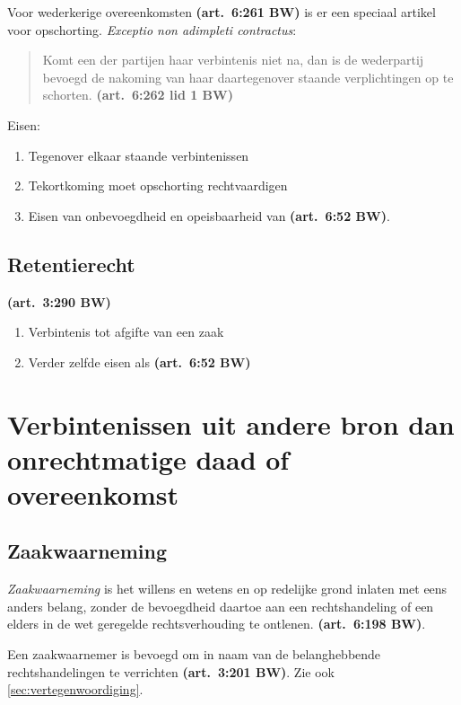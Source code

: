 \documentclass[a4paper]{article}
\newcommand{\art}[1]{\textbf{(art.~#1 BW)}\xspace}
\begin{document}
Voor wederkerige overeenkomsten \art{6:261} is er een speciaal artikel voor
opschorting. \emph{Exceptio non adimpleti contractus}:

\begin{quote}
  
  Komt een der partijen haar verbintenis niet na, dan is de wederpartij
  bevoegd de nakoming van haar daartegenover staande verplichtingen op te
  schorten. \art{6:262 lid 1}

\end{quote}

Eisen:
\begin{enumerate}
  \item Tegenover elkaar staande verbintenissen
  \item Tekortkoming moet opschorting rechtvaardigen
  \item Eisen van onbevoegdheid en opeisbaarheid van \art{6:52}.
\end{enumerate}

\subsection{Retentierecht}

\art{3:290}

\begin{enumerate}
  \item Verbintenis tot afgifte van een zaak
  \item Verder zelfde eisen als \art{6:52}
\end{enumerate}

\section{Verbintenissen uit andere bron dan onrechtmatige daad of overeenkomst}

\subsection{Zaakwaarneming}

\emph{Zaakwaarneming} is het willens en wetens en op redelijke grond inlaten
met eens anders belang, zonder de bevoegdheid daartoe aan een rechtshandeling
of een elders in de wet geregelde rechtsverhouding te ontlenen. \art{6:198}.

Een zaakwaarnemer is bevoegd om in naam van de belanghebbende
rechtshandelingen te verrichten \art{3:201}. Zie ook
\ref{sec:vertegenwoordiging}.
\end{document}

